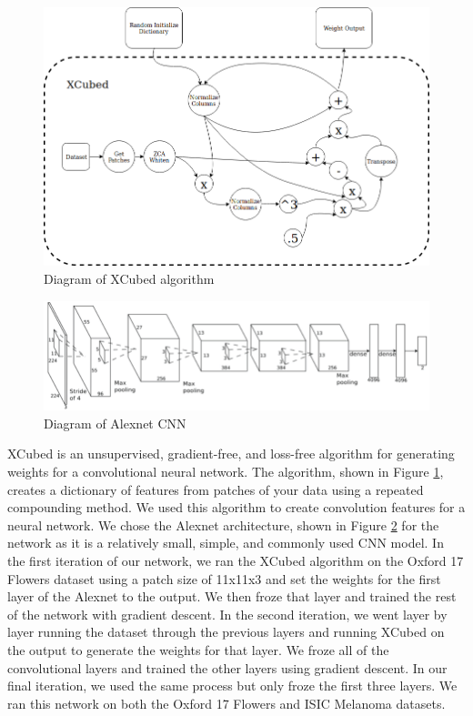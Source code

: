 \documentclass[twocolumn]{article}
\begin{document}
\begin{figure}[!htb]
    \centering
    \includegraphics[width=.8\linewidth]{XCubed_diagram}
    \caption{Diagram of XCubed algorithm}
    \label{fig:diagram}
\end{figure}
\begin{figure}[!htb]
    \centering
    \includegraphics[width=.8\linewidth]{Alexnet_diagram}
    \caption{Diagram of Alexnet CNN}
    \label{fig:alex}
\end{figure}
XCubed is an unsupervised, gradient-free, and loss-free algorithm for generating weights for a convolutional neural network. The algorithm, shown in Figure \ref{fig:diagram}, creates a dictionary of features from patches of your data using a repeated compounding method. We used this algorithm to create convolution features for a neural network. We chose the Alexnet\cite{alexnet} architecture, shown in Figure \ref{fig:alex} for the network as it is a relatively small, simple, and commonly used CNN model. In the first iteration of our network, we ran the XCubed algorithm on the Oxford 17 Flowers dataset\cite{flowers} using a patch size of 11x11x3 and set the weights for the first layer of the Alexnet to the output. We then froze that layer and trained the rest of the network with gradient descent. In the second iteration, we went layer by layer running the dataset through the previous layers and running XCubed on the output to generate the weights for that layer. We froze all of the convolutional layers and trained the other layers using gradient descent. In our final iteration, we used the same process but only froze the first three layers. We ran this network on both the Oxford 17 Flowers and ISIC Melanoma datasets.
\end{document}
